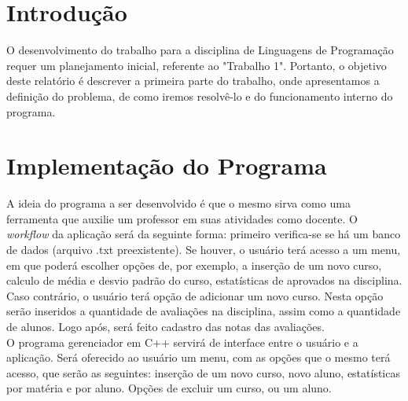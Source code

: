\documentclass[12pt,a4paper]{article}
\begin{document}
%
%

\cleardoublepage
\section{Introdução}

O desenvolvimento do trabalho para a disciplina de Linguagens de Programação requer um planejamento inicial, referente ao "Trabalho 1". Portanto, o objetivo deste relatório é descrever a primeira parte do trabalho, onde apresentamos a definição do problema, de como iremos resolvê-lo e do funcionamento interno do programa.


\section{Implementação do Programa}

A ideia do programa a ser desenvolvido é que o mesmo sirva como uma ferramenta que auxilie um professor em suas atividades como docente. O \textit{workflow} da aplicação será da seguinte forma: primeiro verifica-se se há um banco de dados (arquivo .txt preexistente). Se houver, o usuário terá acesso a um menu, em que poderá escolher opções de, por exemplo, a inserção de um novo curso, calculo de média e desvio padrão do curso, estatísticas de aprovados na disciplina. Caso contrário, o usuário terá opção de adicionar um novo curso. Nesta opção serão inseridos a quantidade de avaliações na disciplina, assim como a quantidade de alunos. Logo após, será feito cadastro das notas das avaliações. ~\\

O programa gerenciador em C++ servirá de interface entre o usuário e a aplicação. Será oferecido ao usuário um menu, com as opções que o mesmo terá acesso, que serão as seguintes: inserção de um novo curso, novo aluno, estatísticas por matéria e por aluno. Opções de excluir um curso, ou um aluno. 




\end{document}
